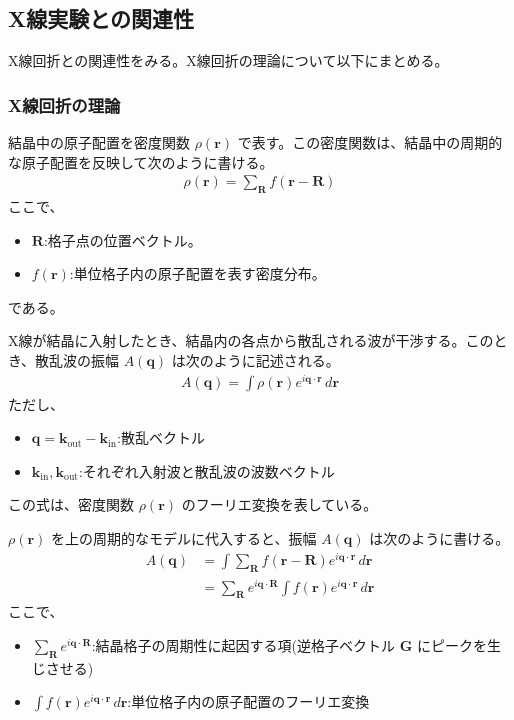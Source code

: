 \documentclass[a4paper,11pt]{jsarticle}
\begin{document}
\subsection{X線実験との関連性}
X線回折との関連性をみる。X線回折の理論について以下にまとめる。
\subsubsection{X線回折の理論}
結晶中の原子配置を密度関数 \(\rho(\bm{r})\) で表す。この密度関数は、結晶中の周期的な原子配置を反映して次のように書ける。
\begin{align}
    \rho(\bm{r}) = \sum_{\bm{R}} f(\bm{r} - \bm{R})
\end{align}
ここで、
\begin{itemize}
    \item \(\bm{R}\):格子点の位置ベクトル。
    \item \(f(\bm{r})\):単位格子内の原子配置を表す密度分布。
\end{itemize}
である。

X線が結晶に入射したとき、結晶内の各点から散乱される波が干渉する。このとき、散乱波の振幅 \(A(\bm{q})\) は次のように記述される。
\begin{align}
    A(\bm{q}) = \int \rho(\bm{r}) e^{i \bm{q} \cdot \bm{r}} \, d\bm{r}
\end{align}
ただし、
\begin{itemize}
    \item \(\bm{q} = \bm{k}_{\text{out}} - \bm{k}_{\text{in}}\):散乱ベクトル
    \item \(\bm{k}_{\text{in}}, \bm{k}_{\text{out}}\):それぞれ入射波と散乱波の波数ベクトル
\end{itemize}
この式は、密度関数 \(\rho(\bm{r})\) のフーリエ変換を表している。

\(\rho(\bm{r})\) を上の周期的なモデルに代入すると、振幅 \(A(\bm{q})\) は次のように書ける。
\begin{align}
    A(\bm{q}) &= \int \sum_{\bm{R}} f(\bm{r} - \bm{R}) e^{i \bm{q} \cdot \bm{r}} \, d\bm{r}\\
     &= \sum_{\bm{R}} e^{i \bm{q} \cdot \bm{R}} \int f(\bm{r}) e^{i \bm{q} \cdot \bm{r}} \, d\bm{r}
\end{align}
ここで、
\begin{itemize}
    \item \(\sum_{\bm{R}} e^{i \bm{q} \cdot \bm{R}}\):結晶格子の周期性に起因する項(逆格子ベクトル \(\bm{G}\) にピークを生じさせる)
    \item \(\int f(\bm{r}) e^{i \bm{q} \cdot \bm{r}} \, d\bm{r}\):単位格子内の原子配置のフーリエ変換
\end{itemize}
\end{document}
